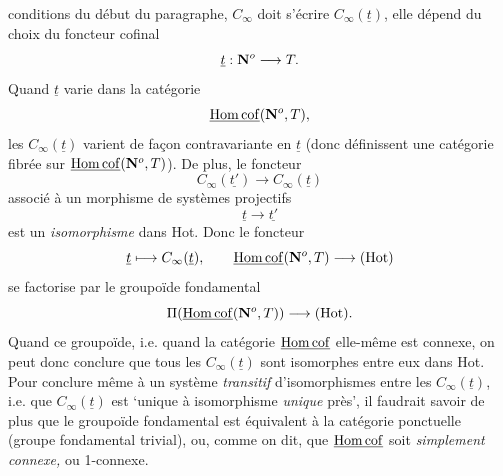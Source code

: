 \dgrchunkbegin

conditions du début du paragraphe, $C_\infty$ doit s'écrire $C_\infty(\underline{t})$, elle dépend du choix du foncteur cofinal
\[
\underline{t} : \mathbf{N}^o \longrightarrow T.
\]
Quand $\underline{t}$ varie dans la catégorie
\[
\underline{\mathrm{Hom\,cof}}(\mathbf{N}^o, T),
\]
les $C_\infty(\underline{t})$ varient de façon contravariante en $\underline{t}$ (donc définissent une catégorie fibrée sur $\underline{\mathrm{Hom\,cof}}(\mathbf{N}^o, T)$). De plus, le foncteur
\[
C_\infty(\underline{t'}) \longrightarrow C_\infty(\underline{t})
\]
associé à un morphisme de systèmes projectifs
\[
\underline{t} \longrightarrow \underline{t'}
\]
est un \textit{isomorphisme} dans Hot. Donc le
foncteur
\[
\underline{t} \longmapsto C_\infty(\underline{t}), \qquad \underline{\mathrm{Hom\,cof}}(\mathbf{N}^o, T) \longrightarrow (\mathrm{Hot})
\]
se factorise par le groupoïde fondamental
\[
\Pi(\underline{\mathrm{Hom\,cof}}(\mathbf{N}^o, T)) \longrightarrow (\mathrm{Hot}).
\]
Quand ce groupoïde, i.e. quand la catégorie $\underline{\mathrm{Hom\,cof}}$ elle-même est connexe, on peut donc conclure que tous les $C_\infty(\underline{t})$ sont isomorphes entre eux dans Hot. Pour conclure même à un système \textit{transitif} d'isomorphismes entre les $C_\infty(\underline{t})$, i.e. que $C_\infty(\underline{t})$ est ‘unique à isomorphisme \textit{unique} près’, il faudrait savoir de plus que le groupoïde fondamental est équivalent à la catégorie ponctuelle (groupe fondamental trivial), ou, comme on dit, que $\underline{\mathrm{Hom\,cof}}$ soit \textit{simplement connexe,} ou 1-connexe.

